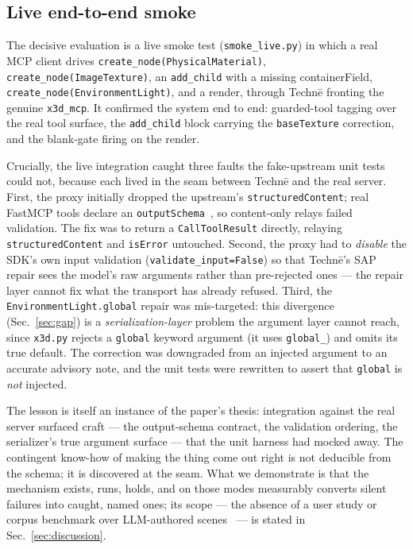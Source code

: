 \documentclass[sigconf,nonacm,screen,anonymous]{acmart}
\begin{document}
\subsection{Live end-to-end smoke}

The decisive evaluation is a live smoke test (\texttt{smoke\_live.py}) in which a real MCP client drives \texttt{create\_node(PhysicalMaterial)}, \texttt{create\_node(ImageTexture)}, an \texttt{add\_child} with a missing containerField, \texttt{create\_node(EnvironmentLight)}, and a render, through Techn\=e fronting the genuine \texttt{x3d\_mcp}. It confirmed the system end to end: guarded-tool tagging over the real tool surface, the \texttt{add\_child} block carrying the \texttt{baseTexture} correction, and the blank-gate firing on the render.

Crucially, the live integration caught three faults the fake-upstream unit tests could not, because each lived in the seam between Techn\=e and the real server. First, the proxy initially dropped the upstream's \texttt{structuredContent}; real FastMCP tools declare an \texttt{outputSchema}~\cite{jsonschema}, so content-only relays failed validation. The fix was to return a \texttt{CallToolResult} directly, relaying \texttt{structuredContent} and \texttt{isError} untouched. Second, the proxy had to \emph{disable} the SDK's own input validation (\texttt{validate\_input=False}) so that Techn\=e's SAP repair sees the model's raw arguments rather than pre-rejected ones --- the repair layer cannot fix what the transport has already refused. Third, the \texttt{EnvironmentLight.global} repair was mis-targeted: this divergence (Sec.~\ref{sec:gap}) is a \emph{serialization-layer} problem the argument layer cannot reach, since \texttt{x3d.py} rejects a \texttt{global} keyword argument (it uses \texttt{global\_}) and omits its true default. The correction was downgraded from an injected argument to an accurate advisory note, and the unit tests were rewritten to assert that \texttt{global} is \emph{not} injected.

The lesson is itself an instance of the paper's thesis: integration against the real server surfaced craft --- the output-schema contract, the validation ordering, the serializer's true argument surface --- that the unit harness had mocked away. The contingent know-how of making the thing come out right is not deducible from the schema; it is discovered at the seam. What we demonstrate is that the mechanism exists, runs, holds, and on those modes measurably converts silent failures into caught, named ones; its scope --- the absence of a user study or corpus benchmark over LLM-authored scenes~\cite{prompteng,x3dexamples} --- is stated in Sec.~\ref{sec:discussion}.
\end{document}
